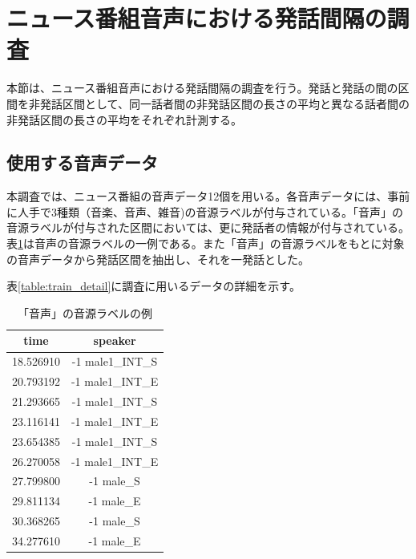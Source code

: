 \section{ニュース番組音声における発話間隔の調査}
\label{section:research_news}
本節は、ニュース番組音声における発話間隔の調査を行う。発話と発話の間の区間を非発話区間として、同一話者間の非発話区間の長さの平均と異なる話者間の非発話区間の長さの平均をそれぞれ計測する。

\subsection{使用する音声データ}
\label{section:detail_train_news}
本調査では、ニュース番組の音声データ12個を用いる。各音声データには、事前に人手で3種類（音楽、音声、雑音)の音源ラベルが付与されている。「音声」の音源ラベルが付与された区間においては、更に発話者の情報が付与されている。表\ref{fig:example_label}は音声の音源ラベルの一例である。また「音声」の音源ラベルをもとに対象の音声データから発話区間を抽出し、それを一発話とした。\par
表\ref{table:train_detail}に調査に用いるデータの詳細を示す。\vspace{0.2in}

\begin{table}[H]
\begin{center}
\caption{「音声」の音源ラベルの例 \label{fig:example_label}}
\begin{tabular}{|c|c|}
\hline
time      & speaker          \\ \hline
18.526910 & -1 male1\_INT\_S \\ \hline
20.793192 & -1 male1\_INT\_E \\ \hline
21.293665 & -1 male1\_INT\_S \\ \hline
23.116141 & -1 male1\_INT\_E \\ \hline
23.654385 & -1 male1\_INT\_S \\ \hline
26.270058 & -1 male1\_INT\_E \\ \hline
27.799800 & -1 male\_S       \\ \hline
29.811134 & -1 male\_E       \\ \hline
30.368265 & -1 male\_S       \\ \hline
34.277610 & -1 male\_E       \\ \hline
\end{tabular}
\end{center}
\end{table}

